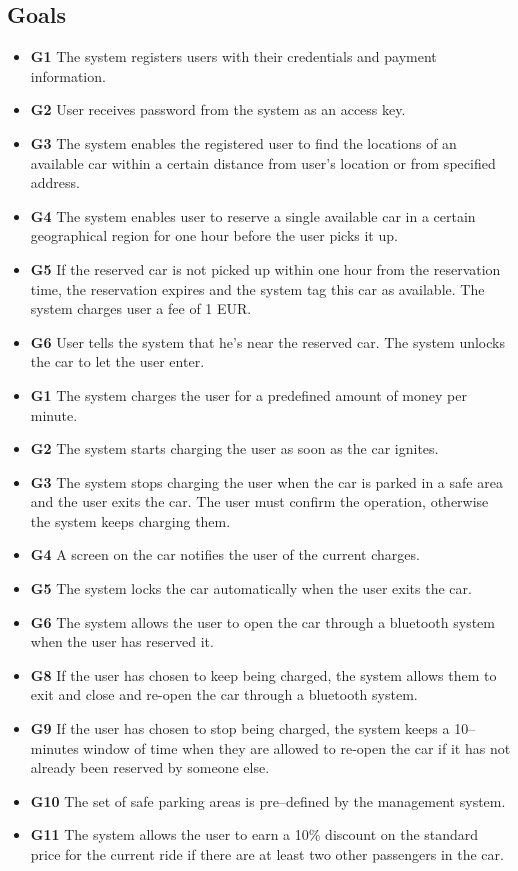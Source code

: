 \documentclass{article}
\begin{document}
		\subsection{Goals}
			\begin{itemize}
				\item \textbf{G1} The system registers users with their credentials and payment information.
				\item \textbf{G2} User receives password from the system as an access key.
				\item \textbf{G3} The system enables the registered user to find the locations of an available car within a certain distance from user's location or from specified address.
				\item \textbf{G4} The system enables user to reserve a single available car in a certain geographical region for one hour before the user picks it up.
				\item \textbf{G5} If the reserved car is not picked up within one hour from the reservation time, the reservation expires and the system tag this car as available. The system charges user a fee of 1 EUR. 
				\item \textbf{G6} User tells the system that he's near the reserved car. The system unlocks the car to let the user enter.  

				\item \textbf{G1} The system charges the user for a predefined amount of money per minute.
				\item \textbf{G2} The system starts charging the user as soon as the car ignites.
				\item \textbf{G3} The system stops charging the user when the car is parked in a safe area and the user exits the car. The user must confirm the operation, otherwise the system keeps charging them. 
				\item \textbf{G4} A screen on the car notifies the user of the current charges.
				\item \textbf{G5} The system locks the car automatically when the user exits the car. 
				\item \textbf{G6} The system allows the user to open the car through a bluetooth system when the user has reserved it.
				\item \textbf{G8} If the user has chosen to keep being charged, the system allows them to exit and close and re-open the car through a bluetooth system.
				\item \textbf{G9} If the user has chosen to stop being charged, the system keeps a 10–minutes window of time when they are allowed to re-open the car if it has not already been reserved by someone else.
				\item \textbf{G10} The set of safe parking areas is pre–defined by the management system.
				\item \textbf{G11} The system allows the user to earn a 10\% discount on the standard price for the current ride if there are at least two other passengers in the car.


\end{itemize}
\end{document}
